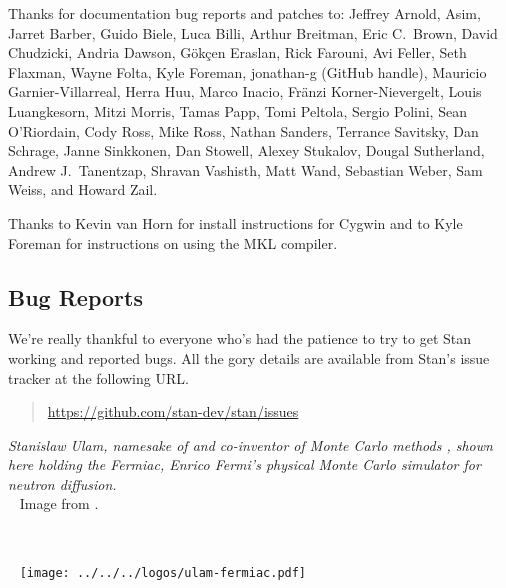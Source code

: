 Thanks for documentation bug reports and patches to: 
Jeffrey Arnold,
Asim, 
Jarret Barber, 
Guido Biele,
Luca Billi, 
Arthur Breitman,
Eric C.~Brown, 
David Chudzicki,
Andria Dawson, 
G\"{o}k\c{c}en Eraslan,
Rick Farouni,
Avi Feller,
Seth Flaxman, 
Wayne Folta, 
Kyle Foreman,
jonathan-g (GitHub handle),
Mauricio Garnier-Villarreal,
Herra Huu,
Marco Inacio, 
Fr\"anzi Korner-Nievergelt,
Louis Luangkesorn, 
Mitzi Morris,
Tamas Papp, 
Tomi Peltola,
Sergio Polini,
Sean O'Riordain, 
Cody Ross, 
Mike Ross, 
Nathan Sanders, 
Terrance Savitsky,
Dan Schrage,
Janne Sinkkonen, 
Dan Stowell, 
Alexey Stukalov,
Dougal Sutherland, 
Andrew J.~Tanentzap,
Shravan Vashisth, 
Matt Wand,
Sebastian Weber, 
Sam Weiss, and
Howard Zail.

Thanks to Kevin van Horn for install instructions for Cygwin and to
Kyle Foreman for instructions on using the MKL compiler.


\subsection*{Bug Reports}

We're really thankful to everyone who's had the patience to try
to get Stan working and reported bugs.  All the gory details are
available from Stan's issue tracker at the following URL.
%
\begin{quote}
\url{https://github.com/stan-dev/stan/issues}
\end{quote}




\vfill
\begin{center}
\hfill
\begin{minipage}[b]{2in}
  \footnotesize {\it Stanislaw Ulam, namesake of \Stan and co-inventor
    of Monte Carlo methods \citep{MetropolisUlam:1949}, shown here
    holding the Fermiac, Enrico Fermi's physical Monte Carlo simulator
    for neutron diffusion.}
  \\[3pt] \mbox{ } \hfill
  {\scriptsize Image from \citep{Giesler:2000}.}
\end{minipage} \ \ \ \ \ 
\begin{minipage}[b]{1.5in} \mbox{ } \hfill
  \texttt{[image: ../../../logos/ulam-fermiac.pdf]}
\end{minipage} 
\end{center}
